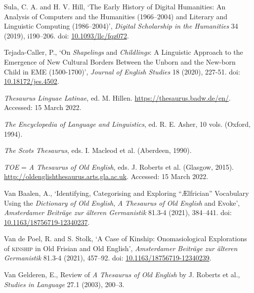 \begin{list}{}
\item %
Sula, C. A. and H. V. Hill, `The Early History of Digital Humanities: An Analysis of Computers and the Humanities (1966–2004) and Literary and Linguistic Computing (1986–2004)', \textit{Digital Scholarship in the Humanities} 34 (2019), i190–206. doi: \href{https://doi.org/10.1093/llc/fqz072}{\url{10.1093/llc/fqz072}}.

\item %
Tejada-Caller, P., `On \textit{Shapelings} and \textit{Childlings}: A Linguistic Approach to the Emergence of New Cultural Borders Between the Unborn and the New-born Child in EME (1500-1700)', \textit{Journal of English Studies} 18 (2020), 227-51. doi: \href{https://doi.org/10.18172/jes.4502}{\url{10.18172/jes.4502}}.

\item
\textit{Thesaurus Linguae Latinae}, ed. M. Hillen. \url{https://thesaurus.badw.de/en/}. Accessed: 15 March 2022.

\item %
\textit{The Encyclopedia of Language and Linguistics}, ed. R. E. Asher, 10 vols. (Oxford, 1994).

\item %
\textit{The Scots Thesaurus}, eds. I. Macleod et al. (Aberdeen, 1990).

\item %
\textit{TOE} = \textit{A Thesaurus of Old English}, eds. J. Roberts et al. (Glasgow, 2015). \url{http://oldenglishthesaurus.arts.gla.ac.uk}. Accessed: 15 March 2022.

\item %
Van Baalen, A., `Identifying, Categorising and Exploring ``Ælfrician'' Vocabulary Using the \textit{Dictionary of Old English}, \textit{A Thesaurus of Old English} and Evoke', \textit{Amsterdamer Beiträge zur älteren Germanistik} 81.3-4 (2021), 384–441. doi: \href{https://doi.org/10.1163/18756719-12340237}{\url{10.1163/18756719-12340237}}.

\item %
Van de Poel, R. and S. Stolk, `A Case of Kinship: Onomasiological Explorations of \textsc{kinship} in Old Frisian and Old English', \textit{Amsterdamer Beiträge zur älteren Germanistik} 81.3-4 (2021), 457–92. doi: \href{https://doi.org/10.1163/18756719-12340239}{\url{10.1163/18756719-12340239}}.

\item %
Van Gelderen, E., Review of \textit{A Thesaurus of Old English} by J. Roberts et al., \textit{Studies in Language} 27.1 (2003), 200–3.


\end{list}
